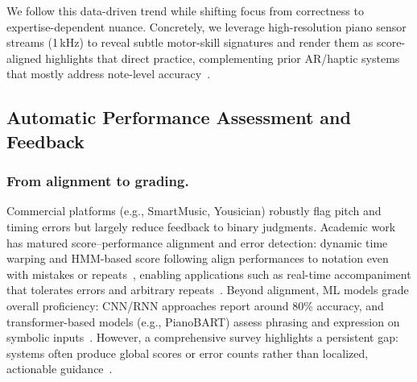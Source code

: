 \documentclass[sigconf,review,anonymous]{acmart}
\begin{document}
We follow this data-driven trend while shifting focus from correctness to expertise-dependent nuance. Concretely, we leverage high-resolution piano sensor streams (1\,kHz) to reveal subtle motor-skill signatures and render them as score-aligned highlights that direct practice, complementing prior AR/haptic systems that mostly address note-level accuracy~\cite{Rogers2014,Chiang2015,Rigby2020,Johnson2010,Yuksel2016,Wilson2023VRPianoReview,Donahue2019,xiao2011,Karolus2023,Dannenberg1992}.

\subsection{Automatic Performance Assessment and Feedback}
\label{sec:rw-assessment}

\subsubsection{From alignment to grading.}
Commercial platforms (e.g., SmartMusic, Yousician) robustly flag pitch and timing errors but largely reduce feedback to binary judgments. Academic work has matured score--performance alignment and error detection: dynamic time warping and HMM-based score following align performances to notation even with mistakes or repeats~\cite{nakamura2016}, enabling applications such as real-time accompaniment that tolerates errors and arbitrary repeats~\cite{nakamura2016}. Beyond alignment, ML models grade overall proficiency: CNN/RNN approaches report around 80\% accuracy, and transformer-based models (e.g., PianoBART) assess phrasing and expression on symbolic inputs~\cite{liang2024}. However, a comprehensive survey highlights a persistent gap: systems often produce global scores or error counts rather than localized, actionable guidance~\cite{Kim2022APPA}.
\end{document}
